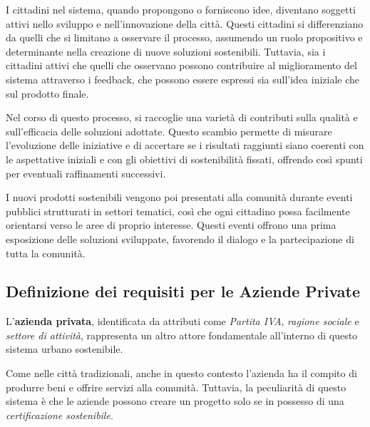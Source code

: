 \documentclass{article}
\begin{document}
\par\vspace{0.3cm}

I cittadini nel sistema, quando propongono o forniscono idee, diventano soggetti attivi nello sviluppo e nell'innovazione della città. Questi cittadini si differenziano da quelli che si limitano a osservare il processo, assumendo un ruolo propositivo e determinante nella creazione di nuove soluzioni sostenibili. Tuttavia, sia i cittadini attivi che quelli che osservano possono contribuire al miglioramento del sistema attraverso i  feedback, che possono essere espressi sia sull'idea iniziale che sul prodotto finale.

\par\vspace{0.3cm}

Nel corso di questo processo, si raccoglie una varietà di contributi sulla qualità e sull’efficacia delle soluzioni adottate. Questo scambio permette di misurare l’evoluzione delle iniziative e di accertare se i risultati raggiunti siano coerenti con le aspettative iniziali e con gli obiettivi di sostenibilità fissati, offrendo così spunti per eventuali raffinamenti successivi.

\par\vspace{0.3cm}

I nuovi prodotti sostenibili vengono poi presentati alla comunità durante eventi pubblici strutturati in settori tematici, così che ogni cittadino possa facilmente orientarsi verso le aree di proprio interesse. Questi eventi offrono una prima esposizione delle soluzioni sviluppate, favorendo il dialogo e la partecipazione di tutta la comunità.


\newpage
\subsection{Definizione dei requisiti per le Aziende Private}

L’\textbf{azienda privata}, identificata da attributi come \textit{Partita IVA}, \textit{ragione sociale} e \textit{settore di attività}, rappresenta un altro attore fondamentale all’interno di questo sistema urbano sostenibile.

\par\vspace{0.3cm}

Come nelle città tradizionali, anche in questo contesto l'azienda ha il compito di produrre beni e offrire servizi alla comunità. Tuttavia, la peculiarità di questo sistema è che le aziende possono creare un progetto solo se in possesso di una \textit{certificazione sostenibile}.
\end{document}
